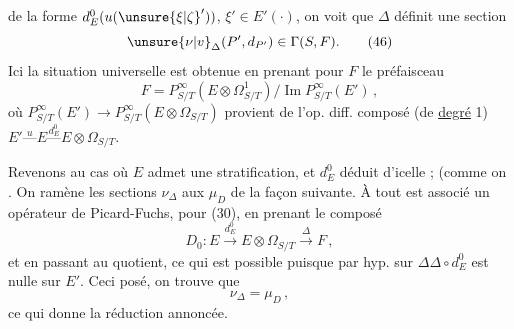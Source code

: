 de la forme $d^0_E(u({\unsure{\xi|\zeta}}'))$, $\xi'\in E'(\cdot)$, on voit que $\Delta$ définit une section
\[
 \unsure{\nu|v}_\Delta(P',d_{P'})\in\Gamma(S,F). \tag*{(46)}
\]
Ici la situation universelle est obtenue en prenant pour $F$ le préfaisceau
\[
 F=P^\infty_{S/T}(E\otimes\Omega^{1}_{S/T})/\operatorname{Im}P^\infty_{S/T}(E')\,,
\]
où $P^\infty_{S/T}(E')\longrightarrow P^\infty_{S/T}(E\otimes\Omega_{S/T})$ provient de l'op. diff. composé (de \uline{degré} 1)  $E'\mathrel{\overset{u}{\text{---}}}E\mathrel{\overset{d^0_E}{\text{---}}}E\otimes\Omega_{S/T}$.

Revenons au cas où $E$ admet une stratification,  et  $d^0_E$ déduit d'icelle ;   (comme on   .  On ramène les sections $\nu_\Delta$ aux $\mu_D$ de la façon suivante. À tout \deleted{\unsure{$\nu_\Delta$}} \inserted{$\Delta$} est associé un opérateur de Picard-Fuchs,  pour (30), en prenant le composé
\[
 D_0:E\xrightarrow{d^0_E}E\otimes\Omega_{S/T}\xrightarrow{\Delta}F \,, \tag*{(47)}
\]
et en passant au quotient,   ce qui est possible puisque par hyp. sur $\Delta$\quad $\Delta\circ d^0_E$ est nulle sur $E'$. Ceci posé, on trouve que
\[
 \nu_\Delta=\mu_D \,, \tag*{(48)}
\]
ce qui donne la réduction annoncée.
